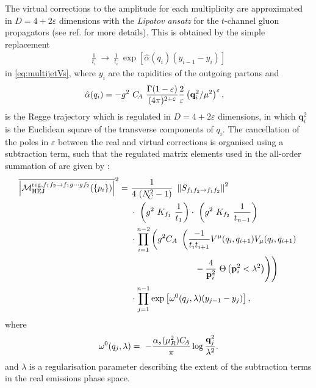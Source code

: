 The virtual corrections to the amplitude for each multiplicity are
approximated in $D=4+2\varepsilon$ dimensions with the \emph{Lipatov
 ansatz} \cite{Balitsky:1978ic} for the $t$-channel gluon propagators (see
ref.\@ \cite{Andersen:2009nu} for more details). This is obtained by the simple
replacement
\begin{align}
  \label{eq:LipatovAnsatz} \frac 1 {t_i}\ \to\ \frac 1 {t_i}\ \exp\left[\hat
\alpha (q_i)(y_{i-1}-y_i)\right]
\end{align}
in \cref{eq:multijetVs}, where $y_i$ are the rapidities of the outgoing partons and
\begin{align} 
  \hat{\alpha}(q_i)&=-g^2\ C_{\!A}\
  \frac{\Gamma(1-\varepsilon)}{(4\pi)^{2+\varepsilon}}\frac 2
  \varepsilon\left({\bf q}_i^2/\mu^2\right)^\varepsilon\label{eq:ahatdimreg},
\end{align} 
is the Regge trajectory which is regulated in $D=4+2\varepsilon$ dimensions, in which
$\mathbf{q}_i^2$ is the Euclidean square of the transverse components of
$q_i$. The cancellation of the poles in $\varepsilon$ between the real and
virtual corrections is organised using a subtraction term,
such that the regulated matrix elements used in the  all-order summation of \HEJ
are given by \cite{Andersen:2011hs}:
\begin{align}
  \label{eq:MHEJ}
  \begin{split}
    \overline{\left|\mathcal{M}_{\rm HEJ}^{\mathrm{reg}, f_1 f_2\to f_1 g
          \cdots g f_2}(\{ p_i\})\right|}^2 = \ &\frac 1 {4\
       (\Nc^2-1)}\ \left\|S_{f_1 f_2\to f_1 f_2}\right\|^2\\
     &\cdot\ \left(g^2\ K_{f_1}\ \frac 1 {t_1}\right) \cdot\ \left(g^2\ K_{f_2}\ \frac 1
       {t_{n-1}}\right)\\
     & \cdot \prod_{i=1}^{n-2} \left( {g^2 C_A}\
       \left(\frac {-1}{t_it_{i+1}} V^\mu(q_i,q_{i+1})V_\mu(q_i,q_{i+1}) \right. \right. \\
     &\left. \left. \phantom{\cdot \prod_{i=1}^{n-2} g^2 C_A \frac {-1}{t_it_{i+1}}}-\frac{4}{\mathbf{p}_i^2} \ \Theta\left(\mathbf{p}_i^2<\lambda^ 2\right)\right)\right)\\
     & \cdot \prod_{j=1}^{n-1} \exp\left[\omega^0(q_j,\lambda)(y_{j-1}-y_j)\right],
  \end{split}
\end{align}
where
\begin{equation}
\omega^0(q_j,\lambda)=\ -\frac{\alpha_s(\mu^2_R) C_{\!A}}{\pi} \log\frac{{\bf q}_j^2}{\lambda^2}.
\end{equation}
and $\lambda$ is a regularisation parameter describing the extent of the
subtraction terms in the real emissions phase space.


